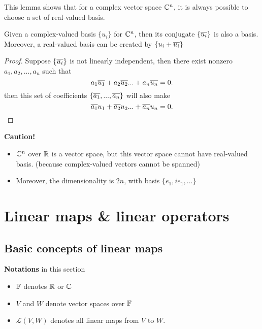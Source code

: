 \begin{refsection}
\begin{remark}
This lemma shows that for a complex vector space $\mathbb{C}^n$, it is always possible to choose a set of real-valued basis.	
\end{remark}

\begin{lemma}
Given a complex-valued basis $\{u_i\}$ for $\mathbb{C}^n$, then its conjugate $\{\overline{u_i}\}$ is also a basis. Moreover, a real-valued basis can be created by $\{u_i + \overline{u_i}\}$
\end{lemma}
\begin{proof}
Suppose $\{\overline{u_i}\}$ is not linearly independent, then there exist nonzero $a_1,a_2,...,a_n$ such that
$$a_1\overline{u_1}+a_2\overline{u_2}...+a_n\overline{u_n} = 0.$$
then this set of coefficients $\{\overline{a_1}, ...,\overline{a_n}\}$ will also make 
$$\overline{a_1}u_1+\overline{a_2}u_2...+\overline{a_n}u_n = 0.$$	
\end{proof}



\begin{mdframed}
\textbf{Caution!}
\begin{itemize}
    \item $\mathbb{C}^n$ over $\mathbb{R}$ is a vector space, but this vector space cannot have real-valued basis. (because complex-valued vectors cannot be spanned)
    \item Moreover, the dimensionality is $2n$, with basis $\{e_1,ie_1,...\}$
\end{itemize}

\end{mdframed}





\section{Linear maps \& linear operators} 
\subsection{Basic concepts of linear maps}
\begin{mdframed}
\textbf{Notations} in this section
\begin{itemize}
    \item $\mathbb{F}$ denotes $\mathbb{R}$ or $\mathbb{C}$
    \item $V$ and $W$ denote vector spaces over $\mathbb{F}$
    \item $\mathcal{L}(V,W)$ denotes all linear maps from $V$ to $W$.
\end{itemize}
\end{mdframed}


\end{refsection}
